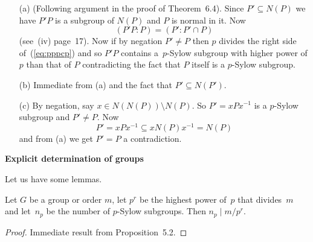 \documentclass[12pt]{book}
\newcounter{myenumi}
\newenvironment{myenumerate}
{\begin{enumerate}
 \setcounter{enumi}{\themyenumi}
}
{\setcounter{myenumi}{\theenumi}
 \end{enumerate}}
\begin{document}
\begin{myenumerate}
\begin{itemize}
 \item[(a)] (Following argument in the proof of Theorem~6.4).
     Since \(P'\subseteq N(P)\)
     we have \(P'P\) is a subgroup of \(N(P)\) and $P$ is normal in it.
     Now
     \begin{equation}\label{eq:pppcp}
     (P'P:P) = (P':P'\cap P)
     \end{equation}
     (see~(iv) page~17).
     Now if by negation \(P'\neq P\) then $p$ divides
     the right side of~(\ref{eq:pppcp}) and so \(P'P\) contains
     a~$p$-Sylow subgroup with higher power of $p$ than that of $P$
     contradicting the fact that $P$ itself is a $p$-Sylow subgroup.
 \item[(b)] Immediate from (a) and the fact that \(P'\subseteq N(P')\).
 \item[(c)] By negation, say \(x\in N(N(P))\setminus N(P)\).
   So \(P' = xPx^{-1}\) is a $p$-Sylow subgroup and \(P'\neq P\).
   Now \[P' = xPx^{-1} \subseteq xN(P)x^{-1} = N(P)\]
   and from (a) we get \(P'=P\) a contradiction.
\end{itemize}
\end{myenumerate}

\textbf{Explicit determination of groups}

Let us have some lemmas.

\begin{llem} \label{llem:npdiv}
Let $G$ be a group or order $m$,
let \(p^r\) be the highest power of~$p$ that divides~$m$
and let~\(n_p\) be the number of $p$-Sylow subgroups.
Then \(n_p \mid m/p^r\).
\end{llem}
\begin{proof}
Immediate result from Proposition~5.2.
\end{proof}
\end{document}
